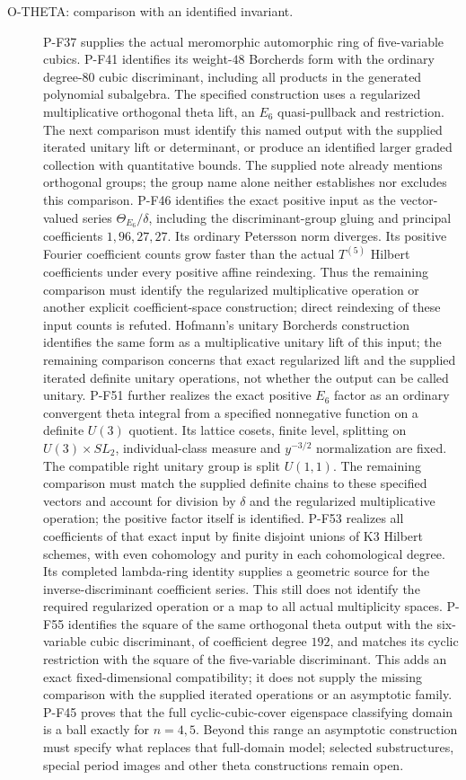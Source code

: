 \begin{description}
\item[O-THETA: comparison with an identified invariant.]
P-F37 supplies the actual meromorphic automorphic ring of
five-variable cubics. P-F41 identifies its weight-$48$
Borcherds form with the ordinary degree-$80$ cubic discriminant,
including all products in the generated polynomial subalgebra.
The specified construction uses a regularized multiplicative
orthogonal theta lift, an $E_6$ quasi-pullback and restriction.
The next comparison must identify this named output with the
supplied iterated unitary lift or determinant, or produce an
identified larger graded collection with quantitative bounds.
The supplied note already mentions orthogonal groups; the group
name alone neither establishes nor excludes this comparison.
P-F46 identifies the exact positive input as the vector-valued
series $\Theta_{E_6}/\delta$, including the discriminant-group
gluing and principal coefficients $1,96,27,27$. Its ordinary
Petersson norm diverges. Its positive Fourier coefficient counts
grow faster than the actual $T^{(5)}$ Hilbert coefficients under
every positive affine reindexing. Thus the remaining comparison
must identify the regularized multiplicative operation or another
explicit coefficient-space construction; direct reindexing of
these input counts is refuted. Hofmann's unitary Borcherds
construction identifies the same form as a multiplicative
unitary lift of this input; the remaining comparison concerns
that exact regularized lift and the supplied iterated definite
unitary operations, not whether the output can be called unitary.
P-F51 further realizes the exact positive $E_6$ factor as an
ordinary convergent theta integral from a specified nonnegative
function on a definite $U(3)$ quotient. Its lattice cosets,
finite level, splitting on $U(3)\times SL_2$, individual-class
measure and $y^{-3/2}$ normalization are fixed. The compatible
right unitary group is split $U(1,1)$. The remaining comparison
must match the supplied definite chains to these specified
vectors and account for division by $\delta$ and the regularized
multiplicative operation; the positive factor itself is identified.
P-F53 realizes all coefficients of that exact input by finite
disjoint unions of K3 Hilbert schemes, with even cohomology
and purity in each cohomological degree. Its completed
lambda-ring identity supplies a geometric source for the
inverse-discriminant coefficient series. This still does not
identify the required regularized operation or a map to all
actual multiplicity spaces.
P-F55 identifies the square of the same orthogonal theta output
with the six-variable cubic discriminant, of coefficient degree
$192$, and matches its cyclic restriction with the square of
the five-variable discriminant. This adds an exact fixed-dimensional
compatibility; it does not supply the missing comparison with
the supplied iterated operations or an asymptotic family.
P-F45 proves that the full cyclic-cubic-cover eigenspace
classifying domain is a ball exactly for $n=4,5$. Beyond
this range an asymptotic construction must specify what
replaces that full-domain model; selected substructures,
special period images and other theta constructions remain open.


\end{description}
